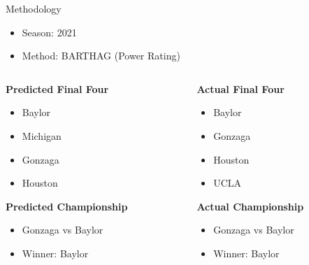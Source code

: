 \documentclass{beamer}
\begin{document}
\begin{frame}{Methodology}
\begin{itemize}
  \item Season: 2021
  \item Method: BARTHAG (Power Rating)
\end{itemize}

\begin{columns}[T] %
\begin{column}{0.5\textwidth} %
  \textbf{Predicted Final Four}
  \begin{itemize}
    \item Baylor
    \item Michigan
    \item Gonzaga
    \item Houston
  \end{itemize}
  \textbf{Predicted Championship}
  \begin{itemize}
    \item Gonzaga vs Baylor
    \item Winner: Baylor
    \end{itemize}
\end{column}
\begin{column}{0.5\textwidth} %
  \textbf{Actual Final Four}
  \begin{itemize}
    \item Baylor
    \item Gonzaga
    \item Houston
    \item UCLA
  \end{itemize}
  \textbf{Actual Championship}
  \begin{itemize}
  \item Gonzaga vs Baylor
  \item Winner: Baylor
  \end{itemize}
\end{column}
\end{columns}
\end{frame}
\end{document}
